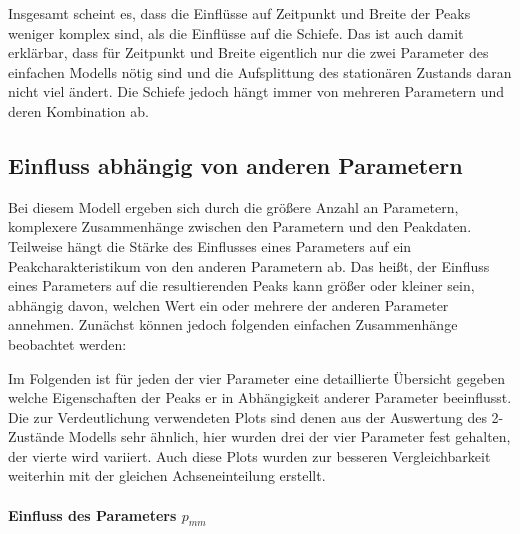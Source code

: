 Insgesamt scheint es, dass die Einflüsse auf Zeitpunkt und Breite der Peaks weniger komplex sind, als die Einflüsse auf die Schiefe. Das ist auch damit erklärbar, dass für Zeitpunkt und Breite eigentlich nur die zwei Parameter des einfachen Modells nötig sind und die Aufsplittung des stationären Zustands daran nicht viel ändert. Die Schiefe jedoch hängt immer von mehreren Parametern und deren Kombination ab.

\subsection{Einfluss abhängig von anderen Parametern}

Bei diesem Modell ergeben sich durch die größere Anzahl an Parametern, komplexere Zusammenhänge zwischen den Parametern und den Peakdaten. Teilweise hängt die Stärke des Einflusses eines Parameters auf ein Peakcharakteristikum von den anderen Parametern ab. Das heißt, der Einfluss eines Parameters auf die resultierenden Peaks kann größer oder kleiner sein, abhängig davon, welchen Wert ein oder mehrere der anderen Parameter annehmen.
Zunächst können jedoch folgenden einfachen Zusammenhänge beobachtet werden:


Im Folgenden ist für jeden der vier Parameter eine detaillierte Übersicht gegeben welche Eigenschaften der Peaks er in Abhängigkeit anderer Parameter beeinflusst. Die zur Verdeutlichung verwendeten Plots sind denen aus der Auswertung des 2-Zustände Modells sehr ähnlich, hier wurden drei der vier Parameter fest gehalten, der vierte wird variiert. Auch diese Plots wurden zur besseren Vergleichbarkeit weiterhin mit der gleichen Achseneinteilung erstellt. 


\paragraph*{Einfluss des Parameters $p_{mm}$}

% 
% 

